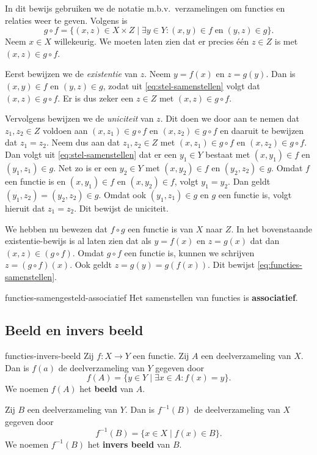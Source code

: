 \begin{bewijs}{}{}
    In dit bewijs gebruiken we de notatie m.b.v.\ verzamelingen om functies en relaties weer te geven.
    Volgens  is
    \begin{equation}
        g \circ f = \{(x,z) \in X \times Z \mid \exists y \in Y: (x,y) \in f \; \text{en}\; (y,z) \in g\}.
        \label{eq:stel-samenstellen}
    \end{equation}
    Neem $x \in X$ willekeurig.
    We moeten laten zien dat er precies één $z \in Z$ is met $(x,z) \in g \circ f$.

    Eerst bewijzen we de \emph{existentie} van $z$.
    Neem $y = f(x)$ en $z = g(y)$.
    Dan is $(x,y) \in f$ en $(y,z) \in g$, zodat uit \cref{eq:stel-samenstellen} volgt dat $(x,z) \in g \circ f$.
    Er is dus zeker een $z \in Z$ met $(x,z) \in g \circ f$.

    Vervolgens bewijzen we de \emph{uniciteit} van $z$.
    Dit doen we door aan te nemen dat $z_1, z_2 \in Z$ voldoen aan $(x, z_1) \in g \circ f$ en $(x,z_2) \in g \circ f$ en daaruit te bewijzen dat $z_1 = z_2$.
    Neem dus aan dat $z_1, z_2 \in Z$ met $(x, z_1) \in g \circ f$ en $(x,z_2) \in g \circ f$.
    Dan volgt uit \cref{eq:stel-samenstellen} dat er een $y_1 \in Y$ bestaat met $(x,y_1) \in f$ en $(y_1, z_1) \in g$.
    Net zo is er een $y_2 \in Y$ met $(x,y_2) \in f$ en $(y_2, z_2) \in g$.
    Omdat $f$ een functie is en $(x,y_1) \in f$ en $(x,y_2) \in f$, volgt $y_1 = y_2$.
    Dan geldt $(y_1,z_2) = (y_2,z_2) \in g$.
    Omdat ook $(y_1,z_1) \in g$ en $g$ een functie is, volgt hieruit dat $z_1 = z_2$.
    Dit bewijst de uniciteit.

    We hebben nu bewezen dat $f \circ g$ een functie is van $X$ naar $Z$.
    In het bovenstaande existentie-bewijs is al laten zien dat als $y = f(x)$ en $z = g(x)$ dat dan $(x,z) \in (g \circ f)$.
    Omdat  $g \circ f$ een functie is, kunnen we schrijven $z = (g \circ f)(x)$.
    Ook geldt $z = g(y) = g(f(x))$.
    Dit bewijst \cref{eq:functies-samenstellen}.
\end{bewijs}

\begin{eigenschap}{}{functies-samengesteld-associatief}
    Het samenstellen van functies is \textbf{associatief}.
\end{eigenschap}


\subsection{Beeld en invers beeld}
\begin{definitie}{}{functies-invers-beeld}
    Zij $f: X \to Y$ een functie.
    Zij $A$ een deelverzameling van $X$.
    Dan is $f(a)$ de deelverzameling van $Y$ gegeven door
    \[
        f(A) = \{y \in Y \mid \exists x \in A: f(x) = y\}.
    \]
    We noemen $f(A)$ het \textbf{beeld} van $A$.

    Zij $B$ een deelverzameling van $Y$.
    Dan is $f^{-1}(B)$ de deelverzameling van $X$ gegeven door
    \[
        f^{-1}(B) = \{x \in X \mid f(x) \in B\}.
    \]
    We noemen $f^{-1}(B)$ het \textbf{invers beeld} van $B$.
\end{definitie}


